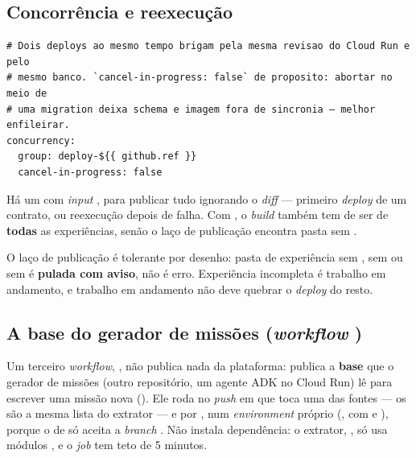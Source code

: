 \subsection{Concorrência e reexecução}

\begin{lstlisting}[language=yamlunoo, caption={A política de concorrência do \emph{deploy}}]
# Dois deploys ao mesmo tempo brigam pela mesma revisao do Cloud Run e pelo
# mesmo banco. `cancel-in-progress: false` de proposito: abortar no meio de
# uma migration deixa schema e imagem fora de sincronia — melhor enfileirar.
concurrency:
  group: deploy-${{ github.ref }}
  cancel-in-progress: false
\end{lstlisting}

\begin{nota}
Há um  com \emph{input} , para publicar tudo
ignorando o \emph{diff} --- primeiro \emph{deploy} de um contrato, ou reexecução
depois de falha. Com , o \emph{build} também tem de ser de
\textbf{todas} as experiências, senão o laço de publicação encontra pasta sem
.
\end{nota}

\begin{nota}
O laço de publicação é tolerante por desenho: pasta de experiência sem
, sem  ou sem  é
\textbf{pulada com aviso}, não é erro. Experiência incompleta é trabalho em
andamento, e trabalho em andamento não deve quebrar o \emph{deploy} do resto.
\end{nota}

\subsection{A base do gerador de missões (\emph{workflow} )}
\label{sec:base-do-gerador}

Um terceiro \emph{workflow}, ,
não publica nada da plataforma: publica a \textbf{base} que o gerador de
missões (outro repositório, um agente ADK no Cloud Run) lê para escrever uma
missão nova (). Ele roda no \emph{push} em  que
toca uma das fontes --- os  são a mesma lista do extrator --- e por
, num \emph{environment} próprio
(, com  e ), porque o de
 só aceita a \emph{branch} . Não instala dependência: o
extrator, , só usa módulos
, e o \emph{job} tem teto de 5 minutos.

